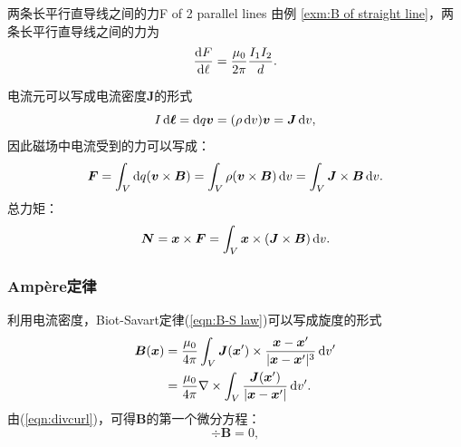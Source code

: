 \begin{example}{两条长平行直导线之间的力}{F of 2 parallel lines}
    由例 \ref{exm:B of straight line}，两条长平行直导线之间的力为
    \begin{equation}
        \frac{\mathrm{d}^{\;\!\!}F}{\mathrm{d} \ell^{\;\!\!}}=\frac{\mu_0}{2\pi}\frac{I_1I_2}d.
    \end{equation}
\end{example}
电流元可以写成电流密度$\bm J$的形式
\[
    I\mathop{}\!\mathrm{d}\bm\ell=\mathop{}\!\mathrm{d} q\bm v=(\rho\mathop{}\!\mathrm{d} v)\bm v=\bm J\mathop{}\!\mathrm{d} v,
\]
因此磁场中电流受到的力可以写成：
\[
    \bm F=\int_V\mathop{}\!\mathrm{d} q(\bm v\times\bm B)=\int_V\rho(\bm v\times\bm B)\mathop{}\!\mathrm{d} v=\int_V\bm J\times\bm B\mathop{}\!\mathrm{d} v.
\]
总力矩：
\[
    \bm N=\bm x\times\bm F=\int_V\bm x\times(\bm J\times\bm B)\mathop{}\!\mathrm{d} v.
\]
\subsubsection{Ampère定律}
利用电流密度，Biot-Savart定律(\ref{eqn:B-S law})可以写成旋度的形式
\begin{align}
    \label{eqn:B(x)}
    \bm B(\bm x)&=\frac{\mu_0}{4\pi}\int_V\bm J(\bm x')\times\frac{\bm x-\bm x'}{|\bm x-\bm x'|^3}\mathop{}\!\mathrm{d} v'\\
    &=\frac{\mu_0}{4\pi}\nabla\times\int_V\frac{\bm J(\bm x')}{|\bm x-\bm x'|}\mathop{}\!\mathrm{d} v'.
\end{align}
由(\ref{eqn:divcurl})，可得$\bm B$的第一个微分方程：
\begin{equation}
    \label{eqn:divB}
    \div\bm B=0,
\end{equation}

